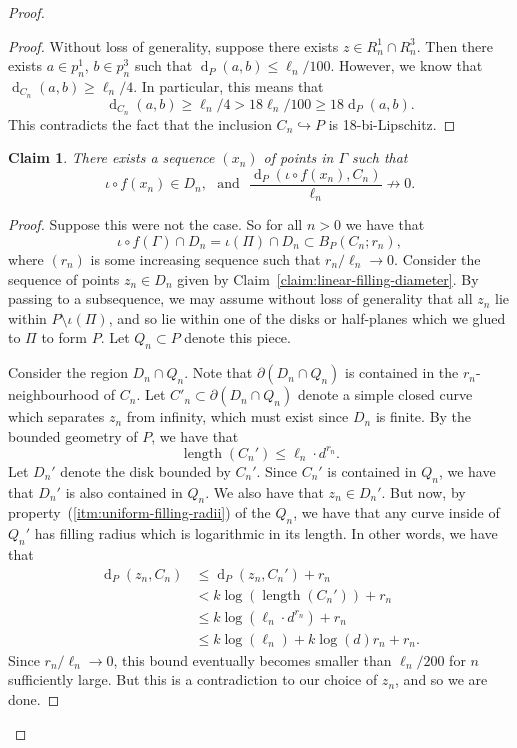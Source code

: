 \documentclass[11pt,a4paper]{amsart}
\DeclareMathOperator{\length}{length}
\DeclareMathOperator{\dist}{d}
\newcommand{\into}{\hookrightarrow}
\newtheorem{claim}[theorem]{Claim}
\theoremstyle{definition}
\begin{document}
\begin{proof}
\begin{proof}
            Without loss of generality, suppose there exists $z \in R_n^1 \cap R_n^3$. Then there exists $a \in p_n^1$, $b \in p_n^3$ such that $\dist_P(a,b) \leq \ell_n/100$. 
            However, we know that $\dist_{C_n}(a,b) \geq \ell_n/4$. 
            In particular, this means that 
            $$
            \dist_{C_n}(a,b) \geq \ell_n/4 >  18\ell_n/100 \geq 18 \dist_P(a,b).
            $$
            This contradicts the fact that the inclusion $C_n \into P$ is 18-bi-Lipschitz. 
        \end{proof}

        \begin{claim}
            There exists a sequence $(x_n)$ of points in $\Gamma$ such that 
            $$
            \iota \circ f(x_n) \in D_n, \ \ \ \text{and} \ \ \ \frac{\dist_P(\iota \circ f(x_n), C_n)}{\ell_n} \not\to 0. 
            $$
        \end{claim}

        \begin{proof}
            Suppose this were not the case. So for all $n > 0$ we have that 
            $$
            \iota \circ f(\Gamma) \cap D_n = \iota(\Pi) \cap D_n \subset B_P(C_n;r_n),
            $$
            where $(r_n)$ is some increasing sequence such that $r_n /\ell_n \to 0$. 
            Consider the sequence of points $z_n \in D_n$ given by Claim~\ref{claim:linear-filling-diameter}. By passing to a subsequence, we may assume without loss of generality that all $z_n$ lie within $P \setminus \iota(\Pi)$, and so lie within one of the disks or half-planes which we glued to $\Pi$ to form $P$. Let $Q_n \subset P$ denote this piece.

            Consider the region $D_n \cap Q_n$. Note that $\partial (D_n \cap Q_n)$ is contained in the $r_n$-neighbourhood of $C_n$. 
            Let $C'_n \subset \partial (D_n \cap Q_n)$ denote a simple closed curve which separates $z_n$ from infinity, which must exist since $D_n$ is finite. 
            By the bounded geometry of $P$, we have that
            $$
            \length(C_n') \leq \ell_n \cdot d^{r_n}.
            $$
            Let $D_n'$ denote the disk bounded by $C_n'$. Since $C_n'$ is contained in $Q_n$, we have that $D_n'$ is also contained in $Q_n$. We also have that $z_n \in D_n'$. But now, by property~(\ref{itm:uniform-filling-radii}) of the $Q_n$, we have that any curve inside of $Q_n'$ has filling radius which is logarithmic in its length. In other words, we have that 
            \begin{align*}
                \dist_P(z_n, C_n) &\leq \dist_P(z_n, C_n') + r_n \\
                &< k \log (\length(C_n')) + r_n\\
                &\leq k \log (\ell_n \cdot d^{r_n}) + r_n\\
                & \leq k \log (\ell_n) + k\log(d)r_n + r_n.
            \end{align*}
            Since $r_n/\ell_n \to 0$, this bound eventually becomes smaller than $\ell_n/200$ for $n$ sufficiently large. 
            But this is a contradiction to our choice of $z_n$, and so we are done.
        \end{proof}


\end{proof}
\end{document}
